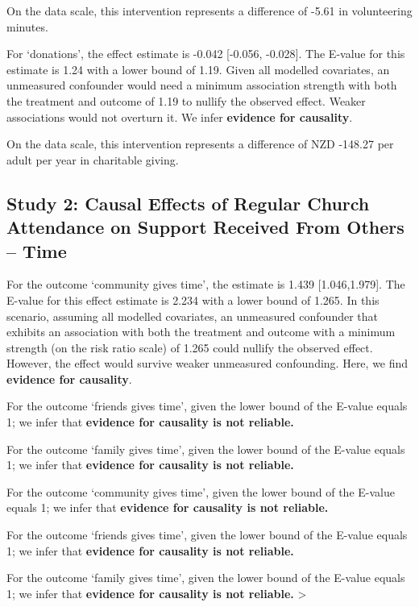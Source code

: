 \documentclass[
  single column]{article}
\begin{document}
On the data scale, this intervention represents a difference of -5.61 in
volunteering minutes.

For `donations', the effect estimate is -0.042 {[}-0.056, -0.028{]}. The
E-value for this estimate is 1.24 with a lower bound of 1.19. Given all
modelled covariates, an unmeasured confounder would need a minimum
association strength with both the treatment and outcome of 1.19 to
nullify the observed effect. Weaker associations would not overturn it.
We infer \textbf{evidence for causality}.

On the data scale, this intervention represents a difference of NZD
-148.27 per adult per year in charitable giving.

\subsection{Study 2: Causal Effects of Regular Church Attendance on
Support Received From Others --
Time}\label{study-2-causal-effects-of-regular-church-attendance-on-support-received-from-others-time}

For the outcome `community gives time', the estimate is 1.439
{[}1.046,1.979{]}. The E-value for this effect estimate is 2.234 with a
lower bound of 1.265. In this scenario, assuming all modelled
covariates, an unmeasured confounder that exhibits an association with
both the treatment and outcome with a minimum strength (on the risk
ratio scale) of 1.265 could nullify the observed effect. However, the
effect would survive weaker unmeasured confounding. Here, we find
\textbf{evidence for causality}.

For the outcome `friends gives time', given the lower bound of the
E-value equals 1; we infer that \textbf{evidence for causality is not
reliable.}

For the outcome `family gives time', given the lower bound of the
E-value equals 1; we infer that \textbf{evidence for causality is not
reliable.}

\newpage{}

For the outcome `community gives time', given the lower bound of the
E-value equals 1; we infer that \textbf{evidence for causality is not
reliable.}

For the outcome `friends gives time', given the lower bound of the
E-value equals 1; we infer that \textbf{evidence for causality is not
reliable.}

For the outcome `family gives time', given the lower bound of the
E-value equals 1; we infer that \textbf{evidence for causality is not
reliable.} \textgreater{}
\end{document}
